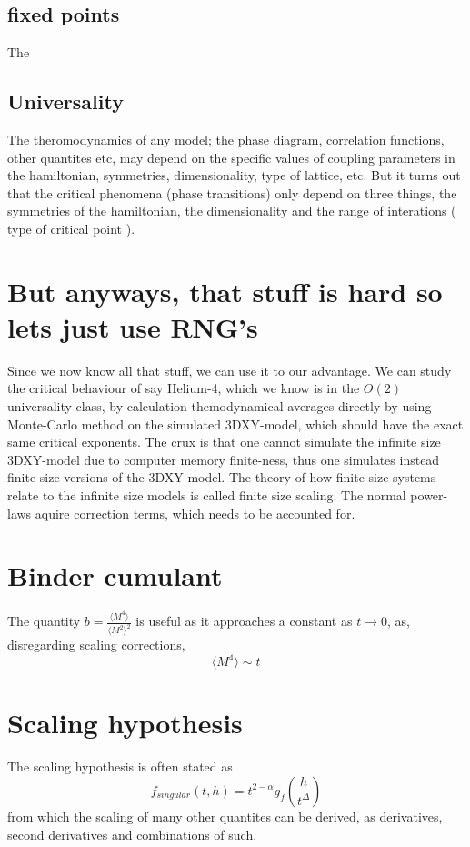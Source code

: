 \documentclass[a4paper]{article}
\begin{document}
\subsection{fixed points}
The 

\subsection{Universality}
The theromodynamics of any model; the phase diagram, correlation functions, other quantites etc, may depend on the specific values of coupling parameters in the hamiltonian, symmetries, dimensionality, type of lattice, etc. 
But it turns out that the critical phenomena (phase transitions) only depend on three things, the symmetries of the hamiltonian, the dimensionality and the range of interations ( type of critical point ).

\section{But anyways, that stuff is hard so lets just use RNG's}
Since we now know all that stuff, we can use it to our advantage. We can study the critical behaviour of say Helium-4, which we know is in the $O(2)$ universality class, by calculation themodynamical averages directly by using Monte-Carlo method on the simulated 3DXY-model, which should have the exact same critical exponents. 
The crux is that one cannot simulate the infinite size 3DXY-model due to computer memory finite-ness, thus one simulates instead finite-size versions of the 3DXY-model. The theory of how finite size systems relate to the infinite size models is called finite size scaling. The normal power-laws aquire correction terms, which needs to be accounted for.

\section{Binder cumulant}
The quantity $b =\frac{\langle M^4 \rangle}{\langle M^2\rangle^2}$ is useful as it approaches a constant as $t\rightarrow 0 $, as,  disregarding scaling corrections,
\begin{equation}
  \langle M^4 \rangle \sim t^{}
\end{equation}
\section{Scaling hypothesis}
The scaling hypothesis is often stated as
\begin{equation}
  f_{singular}(t,h) = t^{2- \alpha} g_f\left(\frac{h}{t^\Delta}\right)
\end{equation}
from which the scaling of many other quantites can be derived, as derivatives, second derivatives and combinations of such.
\end{document}
